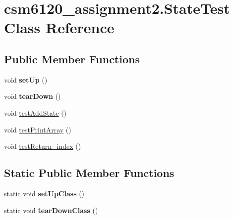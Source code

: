 \hypertarget{classcsm6120__assignment2_1_1_state_test}{\section{csm6120\+\_\+assignment2.\+State\+Test Class Reference}
\label{classcsm6120__assignment2_1_1_state_test}
}
\subsection*{Public Member Functions}
\begin{DoxyCompactItemize}
\item 
\hypertarget{classcsm6120__assignment2_1_1_state_test_a052e558c32c544c13a8a2c30dbaad127}{void {\bfseries set\+Up} ()}\label{classcsm6120__assignment2_1_1_state_test_a052e558c32c544c13a8a2c30dbaad127}

\item 
\hypertarget{classcsm6120__assignment2_1_1_state_test_a9868cc126a697dd0fba13f8f4d4aa032}{void {\bfseries tear\+Down} ()}\label{classcsm6120__assignment2_1_1_state_test_a9868cc126a697dd0fba13f8f4d4aa032}

\item 
void \hyperlink{classcsm6120__assignment2_1_1_state_test_aabd278fc6a63bbb63d07cd5351f9590c}{test\+Add\+State} ()
\item 
void \hyperlink{classcsm6120__assignment2_1_1_state_test_a1356226d0df81678530d6b0b4d54b661}{test\+Print\+Array} ()
\item 
void \hyperlink{classcsm6120__assignment2_1_1_state_test_a261f7846c779d407f33851b2066e219b}{test\+Return\+\_\+index} ()
\end{DoxyCompactItemize}
\subsection*{Static Public Member Functions}
\begin{DoxyCompactItemize}
\item 
\hypertarget{classcsm6120__assignment2_1_1_state_test_aa0293c291d3a8e46ce53a21f2ee22011}{static void {\bfseries set\+Up\+Class} ()}\label{classcsm6120__assignment2_1_1_state_test_aa0293c291d3a8e46ce53a21f2ee22011}

\item 
\hypertarget{classcsm6120__assignment2_1_1_state_test_a38a491bf51f28fcd624c56254e9fe3a9}{static void {\bfseries tear\+Down\+Class} ()}\label{classcsm6120__assignment2_1_1_state_test_a38a491bf51f28fcd624c56254e9fe3a9}

\end{DoxyCompactItemize}


